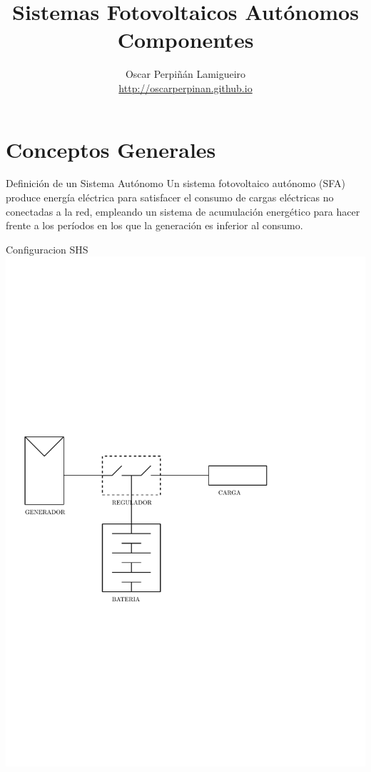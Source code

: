 \documentclass[xcolor={usenames,svgnames,dvipsnames}]{beamer}
\author{Oscar Perpiñán Lamigueiro \\ \url{http://oscarperpinan.github.io}}
\date{}
\title{Sistemas Fotovoltaicos Autónomos \\ Componentes}
\begin{document}
\maketitle

\section{Conceptos Generales}
\label{sec-1}

\begin{frame}[label=sec-1-0-1]{Definición de un Sistema Autónomo}
Un sistema fotovoltaico autónomo (SFA) produce energía eléctrica para \alert{satisfacer el consumo de cargas eléctricas no conectadas a la red}, \alert{empleando un sistema de acumulación energético} para hacer frente a los períodos en los que la generación es inferior al consumo.
\end{frame}

\begin{frame}[label=sec-1-0-2]{Configuracion SHS}
\includegraphics[width=.9\linewidth]{../figs/DiagramaUnifilarER_DC.pdf}
\end{frame}
\end{document}
